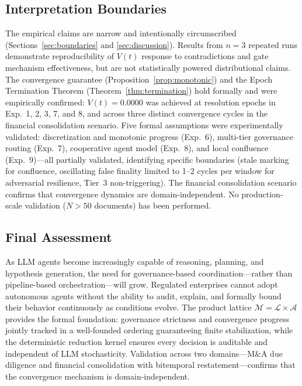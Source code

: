 \documentclass[11pt]{article}
\begin{document}
\subsection{Interpretation Boundaries}

The empirical claims are narrow and intentionally circumscribed (Sections~\ref{sec:boundaries} and \ref{sec:discussion}). Results from $n = 3$ repeated runs demonstrate reproducibility of $V(t)$ response to contradictions and gate mechanism effectiveness, but are not statistically powered distributional claims. The convergence guarantee (Proposition~\ref{prop:monotonic}) and the Epoch Termination Theorem (Theorem~\ref{thm:termination}) hold formally and were empirically confirmed: $V(t) = 0.0000$ was achieved at resolution epochs in Exp.~1, 2, 3, 7, and 8, and across three distinct convergence cycles in the financial consolidation scenario. Five formal assumptions were experimentally validated: discretization and monotonic progress (Exp.~6), multi-tier governance routing (Exp.~7), cooperative agent model (Exp.~8), and local confluence (Exp.~9)---all partially validated, identifying specific boundaries (stale marking for confluence, oscillating false finality limited to 1--2 cycles per window for adversarial resilience, Tier~3 non-triggering). The financial consolidation scenario confirms that convergence dynamics are domain-independent. No production-scale validation ($N > 50$ documents) has been performed.

\subsection{Final Assessment}

As LLM agents become increasingly capable of reasoning, planning, and hypothesis generation, the need for governance-based coordination---rather than pipeline-based orchestration---will grow. Regulated enterprises cannot adopt autonomous agents without the ability to audit, explain, and formally bound their behavior continuously as conditions evolve. The product lattice $\mathcal{M} = \mathcal{L} \times \mathcal{A}$ provides the formal foundation: governance strictness and convergence progress jointly tracked in a well-founded ordering guaranteeing finite stabilization, while the deterministic reduction kernel ensures every decision is auditable and independent of LLM stochasticity. Validation across two domains---M\&A due diligence and financial consolidation with bitemporal restatement---confirms that the convergence mechanism is domain-independent.
\end{document}

